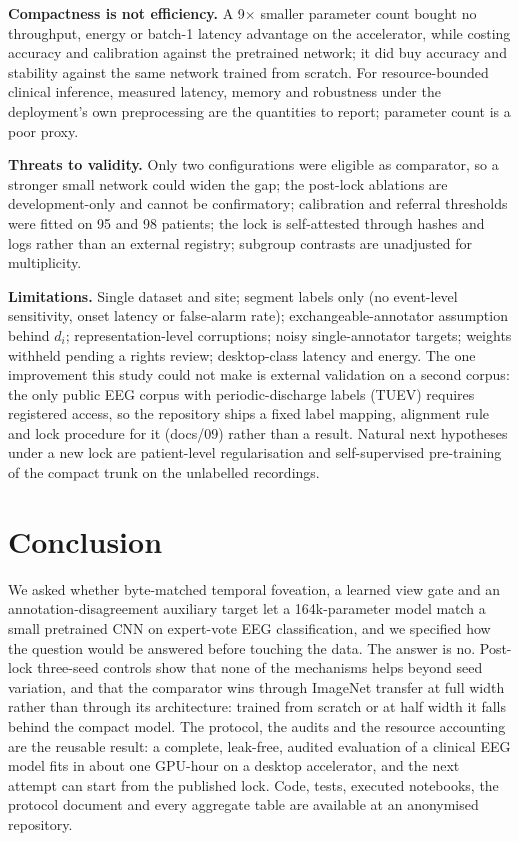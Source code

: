\documentclass[sigconf,anonymous]{acmart}
\newcommand{\repourl}{an anonymised repository}
\newcommand{\repourl}{\url{https://github.com/Hisernberg/cape-eeg}}
\begin{document}
\textbf{Compactness is not efficiency.} A 9$\times$ smaller parameter count bought no throughput, energy or batch-1 latency advantage on the accelerator, while costing accuracy and calibration against the pretrained network; it did buy accuracy and stability against the same network trained from scratch. For resource-bounded clinical inference, measured latency, memory and robustness under the deployment's own preprocessing are the quantities to report; parameter count is a poor proxy.

\textbf{Threats to validity.} Only two configurations were eligible as comparator, so a stronger small network could widen the gap; the post-lock ablations are development-only and cannot be confirmatory; calibration and referral thresholds were fitted on 95 and 98 patients; the lock is self-attested through hashes and logs rather than an external registry; subgroup contrasts are unadjusted for multiplicity.

\textbf{Limitations.} Single dataset and site; segment labels only (no event-level sensitivity, onset latency or false-alarm rate); exchangeable-annotator assumption behind $d_i$; representation-level corruptions; noisy single-annotator targets; weights withheld pending a rights review; desktop-class latency and energy. The one improvement this study could not make is external validation on a second corpus: the only public EEG corpus with periodic-discharge labels (TUEV) requires registered access, so the repository ships a fixed label mapping, alignment rule and lock procedure for it (docs/09) rather than a result. Natural next hypotheses under a new lock are patient-level regularisation and self-supervised pre-training of the compact trunk on the unlabelled recordings.

\section{Conclusion}
We asked whether byte-matched temporal foveation, a learned view gate and an annotation-disagreement auxiliary target let a 164k-parameter model match a small pretrained CNN on expert-vote EEG classification, and we specified how the question would be answered before touching the data. The answer is no. Post-lock three-seed controls show that none of the mechanisms helps beyond seed variation, and that the comparator wins through ImageNet transfer at full width rather than through its architecture: trained from scratch or at half width it falls behind the compact model. The protocol, the audits and the resource accounting are the reusable result: a complete, leak-free, audited evaluation of a clinical EEG model fits in about one GPU-hour on a desktop accelerator, and the next attempt can start from the published lock. Code, tests, executed notebooks, the protocol document and every aggregate table are available at \repourl.
\end{document}

